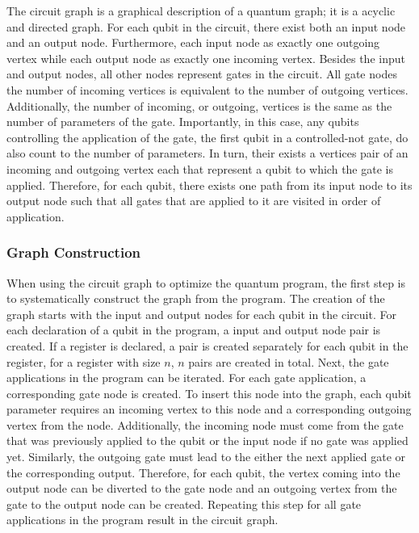 The circuit graph is a graphical description of a quantum graph; it is a acyclic and directed graph. For each qubit in the circuit, there exist both an input node and an output node. Furthermore, each input node as exactly one outgoing vertex while each output node as exactly one incoming vertex. Besides the input and output nodes, all other nodes represent gates in the circuit. All gate nodes the number of incoming vertices is equivalent to the number of outgoing vertices. Additionally, the number of incoming, or outgoing, vertices is the same as the number of parameters of the gate. Importantly, in this case, any qubits controlling the application of the gate, \eg the first qubit in a controlled-not gate, do also count to the number of parameters. In turn, their exists a vertices pair of an incoming and outgoing vertex each that represent a qubit to which the gate is applied. Therefore, for each qubit, there exists one path from its input node to its output node such that all gates that are applied to it are visited in order of application.

\subsubsection{Graph Construction}
When using the circuit graph to optimize the quantum program, the first step is to systematically construct the graph from the program. The creation of the graph starts with the input and output nodes for each qubit in the circuit. For each declaration of a qubit in the program, a input and output node pair is created. If a register is declared, a pair is created separately for each qubit in the register, \ie for a register with size $n$, $n$ pairs are created in total. Next, the gate applications in the program can be iterated. For each gate application, a corresponding gate node is created. To insert this node into the graph, each qubit parameter requires an incoming vertex to this node and a corresponding outgoing vertex from the node. Additionally, the incoming node must come from the gate that was previously applied to the qubit or the input node if no gate was applied yet. Similarly, the outgoing gate must lead to the either the next applied gate or the corresponding output. Therefore, for each qubit, the vertex coming into the output node can be diverted to the gate node and an outgoing vertex from the gate to the output node can be created. Repeating this step for all gate applications in the program result in the circuit graph.

